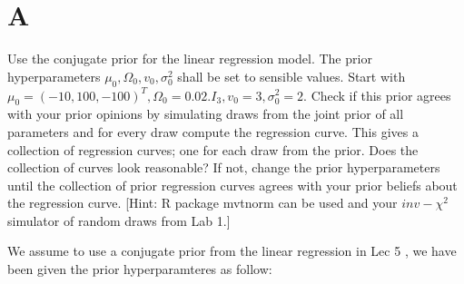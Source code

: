 \documentclass[
]{article}
\newenvironment{Shaded}{\begin{snugshade}}{\end{snugshade}}
\newcommand{\AttributeTok}[1]{\textcolor[rgb]{0.77,0.63,0.00}{#1}}
\newcommand{\CommentTok}[1]{\textcolor[rgb]{0.56,0.35,0.01}{\textit{#1}}}
\newcommand{\DecValTok}[1]{\textcolor[rgb]{0.00,0.00,0.81}{#1}}
\newcommand{\FunctionTok}[1]{\textcolor[rgb]{0.00,0.00,0.00}{#1}}
\newcommand{\NormalTok}[1]{#1}
\newcommand{\OtherTok}[1]{\textcolor[rgb]{0.56,0.35,0.01}{#1}}
\newcommand{\SpecialCharTok}[1]{\textcolor[rgb]{0.00,0.00,0.00}{#1}}
\newcommand{\StringTok}[1]{\textcolor[rgb]{0.31,0.60,0.02}{#1}}
\begin{document}
\begin{Shaded}
\end{Shaded}

\hypertarget{a}{%
\section{A}\label{a}}

Use the conjugate prior for the linear regression model. The prior
hyperparameters \(\mu_0, \Omega_0, v_0, \sigma^2_0\) shall be set to
sensible values. Start with
\(\mu_0=(-10,100,-100)^T, \Omega_0=0.02.I_3, v_0=3, \sigma^2_0=2\).
Check if this prior agrees with your prior opinions by simulating draws
from the joint prior of all parameters and for every draw compute the
regression curve. This gives a collection of regression curves; one for
each draw from the prior. Does the collection of curves look reasonable?
If not, change the prior hyperparameters until the collection of prior
regression curves agrees with your prior beliefs about the regression
curve. {[}Hint: R package mvtnorm can be used and your \(inv-\chi^2\)
simulator of random draws from Lab 1.{]}

We assume to use a conjugate prior from the linear regression in Lec 5 ,
we have been given the prior hyperparamteres as follow:
\end{document}
